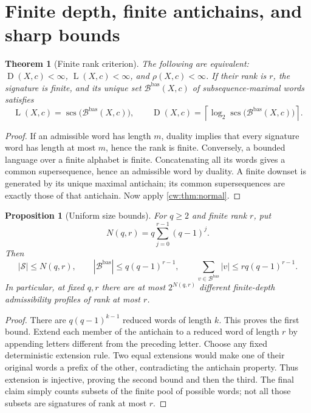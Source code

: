\documentclass[11pt,letterpaper]{article}
\numberwithin{equation}{section}
\newtheorem{theorem}{Theorem}[section]
\newtheorem{proposition}[proposition]{Proposition}
\theoremstyle{definition}
\theoremstyle{remark}
\theoremstyle{definition}
\newcommand{\ceil}[1]{\left\lceil#1\right\rceil}
\newcommand{\scs}{\operatorname{scs}}
\newcommand{\depth}{\operatorname{D}}
\newcommand{\layers}{\operatorname{L}}
\newcommand{\len}[1]{\lvert #1\rvert}
\newcommand{\cwSig}{\mathcal S}
\newcommand{\cwBas}{\mathcal B^{\mathrm{bas}}}
\begin{document}
\section{Finite depth, finite antichains, and sharp bounds}
\label{cw:sec:rank}

\begin{theorem}[Finite rank criterion]\label{cw:thm:finiterank}
The following are equivalent: $\depth(X,c)<\infty$, $\layers(X,c)<\infty$,
and $\rho(X,c)<\infty$. If their rank is $r$, the signature is finite, and
its unique set $\cwBas(X,c)$ of subsequence-maximal words satisfies
\begin{equation}\label{cw:eq:scs}
 \layers(X,c)=\scs\bigl(\cwBas(X,c)\bigr),\qquad
 \depth(X,c)=\ceil{\log_2\scs\bigl(\cwBas(X,c)\bigr)}.
\end{equation}
\end{theorem}
\begin{proof}
If an admissible word has length $m$, duality implies that every signature
word has length at most $m$, hence the rank is finite. Conversely, a bounded
language over a finite alphabet is finite. Concatenating all its words gives
a common supersequence, hence an admissible word by duality. A finite downset
is generated by its unique maximal antichain; its common supersequences are
exactly those of that antichain. Now apply \cref{cw:thm:normal}.
\end{proof}

\begin{proposition}[Uniform size bounds]\label{cw:prop:basisbound}
For $q\ge2$ and finite rank $r$, put
\[
 N(q,r)=q\sum_{j=0}^{r-1}(q-1)^j.
\]
Then
\begin{equation}\label{cw:eq:basisbound}
 |\cwSig|\le N(q,r),\qquad
 |\cwBas|\le q(q-1)^{r-1},\qquad
 \sum_{v\in\cwBas}\len v\le rq(q-1)^{r-1}.
\end{equation}
In particular, at fixed $q,r$ there are at most $2^{N(q,r)}$ different
finite-depth admissibility profiles of rank at most $r$.
\end{proposition}
\begin{proof}
There are $q(q-1)^{k-1}$ reduced words of length $k$. This proves the first
bound. Extend each member of the antichain to a reduced word of length $r$
by appending letters different from the preceding letter. Choose any fixed
deterministic extension rule. Two equal extensions would make one of their
original words a prefix of the other, contradicting the antichain property.
Thus extension is injective, proving the second bound and then the third.
The final claim simply counts subsets of the finite pool of possible words;
not all those subsets are signatures of rank at most $r$.
\end{proof}
\end{document}
